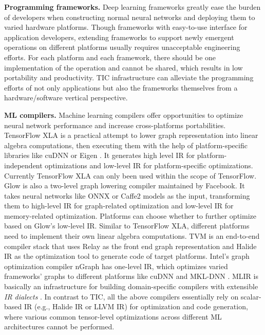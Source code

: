 \textbf{Programming frameworks.} Deep learning frameworks \cite{jia2014caffe, chen2015mxnet,abadi2016tensorflow, seide2016cntk, paszke2017automatic, caffe2} greatly ease the burden of developers when constructing normal neural networks and deploying them to varied hardware platforms. Though frameworks with easy-to-use interface for application developers, extending frameworks to support newly emergent operations on different platforms usually requires unacceptable engineering efforts. For each platform and each framework, there should be one implementation of the operation and cannot be shared, which results in low portability and productivity. TIC infrastructure can alleviate the programming efforts of not only applications but also the frameworks themselves from a hardware/software vertical perspective. %

\textbf{ML compilers.} Machine learning compilers offer opportunities to optimize neural network performance and increase cross-platforms portabilities. TensorFlow XLA \cite{tensorflow2016xla} is a practical attempt to lower graph representation into linear algebra computations, then executing them with the help of platform-specific libraries like cuDNN \cite{chetlur2014cudnn} or Eigen \cite{eigen}. It generates high level IR for platform-independent optimizations and low-level IR for platform-specific optimizations. Currently TensorFlow XLA can only been used within the scope of TensorFlow. Glow \cite{rotem2018glow} is also a two-level graph lowering compiler maintained by Facebook. It takes neural networks like ONNX \cite{onnx} or Caffe2 \cite{caffe2} models as the input, transforming them to high-level IR for graph-related optimization and low-level IR for memory-related optimization. Platforms can choose whether to further optimize based on Glow's low-level IR. Similar to TensorFlow XLA, different platforms need to implement their own linear algebra computations. TVM \cite{chen2018tvm} is an end-to-end compiler stack that uses Relay \cite{roesch2018relay} as the front end graph representation and Halide \cite{ragan2013halide} IR as the optimization tool to generate code of target platforms. Intel's graph optimization compiler nGraph \cite{cyphers2018intel} has one-level IR, which optimizes varied frameworks' graphs to different platforms like cuDNN and MKL-DNN \cite{mkldnn}. MLIR is basically an infrastructure for building domain-specific compilers with extensible \emph{IR dialects} \cite{Lattner2020MLIR}. In contrast to TIC, all the above compilers essentially rely on scalar-based IR (e.g., Halide IR or LLVM IR) for optimization and code generation, where various common tensor-level optimizations across different ML architectures cannot be performed.

